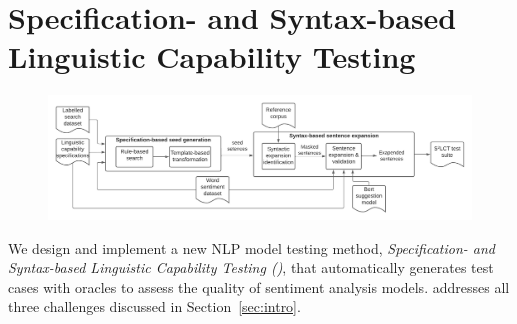 \section{Specification- and Syntax-based Linguistic Capability Testing}
\label{sec:approach}

\begin{figure}[t]
  \centering
  \includegraphics[width=\linewidth]{figs/overview.pdf}
  \vspace{-6mm}
  \caption{\OverviewFigCaption}
\end{figure}

  
  We design and implement a new NLP model testing method,
\emph{Specification- and Syntax-based Linguistic Capability Testing
  (\tool{})}, that automatically generates test cases with oracles to assess the quality of sentiment analysis models. \tool{} addresses all three challenges discussed in Section~\ref{sec:intro}.




